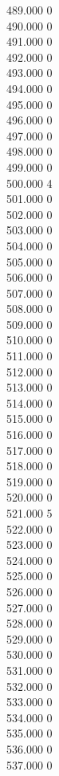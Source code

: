 { 489.000	0 \\
 490.000	0 \\
 491.000	0 \\
 492.000	0 \\
 493.000	0 \\
 494.000	0 \\
 495.000	0 \\
 496.000	0 \\
 497.000	0 \\
 498.000	0 \\
 499.000	0 \\
 500.000	4 \\
 501.000	0 \\
 502.000	0 \\
 503.000	0 \\
 504.000	0 \\
 505.000	0 \\
 506.000	0 \\
 507.000	0 \\
 508.000	0 \\
 509.000	0 \\
 510.000	0 \\
 511.000	0 \\
 512.000	0 \\
 513.000	0 \\
 514.000	0 \\
 515.000	0 \\
 516.000	0 \\
 517.000	0 \\
 518.000	0 \\
 519.000	0 \\
 520.000	0 \\
 521.000	5 \\
 522.000	0 \\
 523.000	0 \\
 524.000	0 \\
 525.000	0 \\
 526.000	0 \\
 527.000	0 \\
 528.000	0 \\
 529.000	0 \\
 530.000	0 \\
 531.000	0 \\
 532.000	0 \\
 533.000	0 \\
 534.000	0 \\
 535.000	0 \\
 536.000	0 \\
 537.000	0 \\
}
